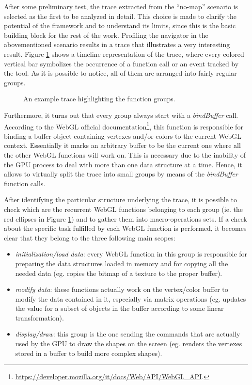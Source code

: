 After some preliminary test, the trace extracted from the ``no-map'' scenario
is selected as the first to be analyzed in detail. This choice is made
to clarify the potential of the framework and to understand its limits, since
this is the basic building block for the rest of the work.
Profiling the navigator in the abovementioned scenario results in a trace that
illustrates a very interesting result. Figure \ref{img:no_map_overview}
shows a timeline representation of the trace, where every colored vertical bar
symbolizes the occurrence of a function call or an event tracked by the tool.
As it is possible to notice, all of them are arranged into fairly regular groups.
\begin{figure}[!htb]
    \caption{An example trace highlighting the function groups.}
    \label{img:no_map_overview}
\end{figure}

Furthermore, it turns out that every group always start with a \emph{bindBuffer}
call. According to the WebGL official documentation\footnote{
\url{https://developer.mozilla.org/it/docs/Web/API/WebGL_API}.}, this function is
responsible for binding a buffer object containing vertexes and/or colors to the
current WebGL context. Essentially it marks an arbitrary buffer to be the current
one where all the other WebGL functions will work on. This is necessary due to the
inability of the GPU process to deal with more than one data structure at a time.
Hence, it allows to virtually split the trace into small groups by means of the
\emph{bindBuffer} function calls.

After identifying the particular structure underlying the trace, it is possible to check
which are the recurrent WebGL functions belonging to each group (ie. the red ellipses
in Figure \ref{img:no_map_overview}) and to gather them into macro-operations sets.
If a check about the specific task fulfilled by each WebGL function is performed, it
becomes clear that they belong to the three following main scopes:
\begin{itemize}
    \item \emph{initialization/load data}: every WebGL function in this group
        is responsible for preparing the data structures loaded in memory
        and for copying all the needed data (eg. copies the bitmap of a texture
        to the proper buffer).
    \item \emph{modify data}: these functions actually work on the vertex/color
        buffer to modify the data contained in it, especially via matrix
        operations (eg. updates the value for a subset of objects in the buffer
        according to some linear transformation).
    \item \emph{display/draw}: this group is the one sending the commands
        that are actually used by the GPU to draw the shapes on the screen
        (eg. renders the vertexes stored in a buffer to build more complex shapes).
\end{itemize}

